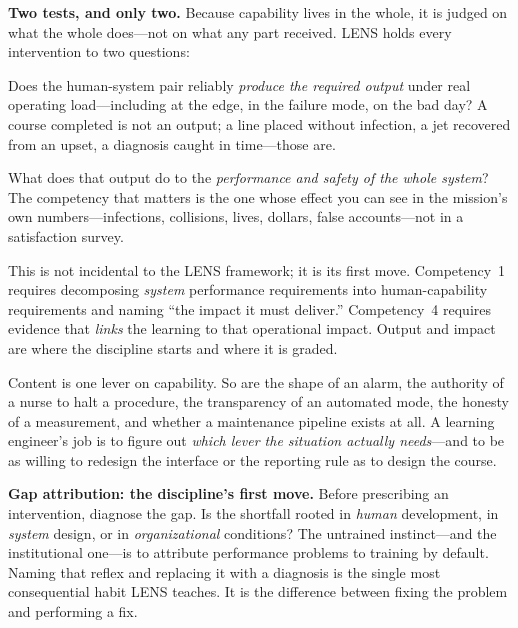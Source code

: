 \documentclass[11pt]{article}
\begin{document}
\begin{softbox}
\textbf{Two tests, and only two.} Because capability lives in the whole, it is judged on what the whole does---not on what any part received. LENS holds every intervention to two questions:

\smallskip
\begin{description}[leftmargin=0em,itemsep=3pt,topsep=2pt,font=\color{lensink}\bfseries]
  \item[Functional output.] Does the human-system pair reliably \emph{produce the required output} under real operating load---including at the edge, in the failure mode, on the bad day? A course completed is not an output; a line placed without infection, a jet recovered from an upset, a diagnosis caught in time---those are.
  \item[System impact.] What does that output do to the \emph{performance and safety of the whole system}? The competency that matters is the one whose effect you can see in the mission's own numbers---infections, collisions, lives, dollars, false accounts---not in a satisfaction survey.
\end{description}
\smallskip
This is not incidental to the LENS framework; it is its first move. Competency~1 requires decomposing \emph{system} performance requirements into human-capability requirements and naming ``the impact it must deliver.'' Competency~4 requires evidence that \emph{links} the learning to that operational impact. Output and impact are where the discipline starts and where it is graded.
\end{softbox}

Content is one lever on capability. So are the shape of an alarm, the authority of a nurse to halt a procedure, the transparency of an automated mode, the honesty of a measurement, and whether a maintenance pipeline exists at all. A learning engineer's job is to figure out \emph{which lever the situation actually needs}---and to be as willing to redesign the interface or the reporting rule as to design the course.

\begin{softbox}
\textbf{Gap attribution: the discipline's first move.} Before prescribing an intervention, diagnose the gap. Is the shortfall rooted in \emph{human} development, in \emph{system} design, or in \emph{organizational} conditions? The untrained instinct---and the institutional one---is to attribute performance problems to training by default. Naming that reflex and replacing it with a diagnosis is the single most consequential habit LENS teaches. It is the difference between fixing the problem and performing a fix.
\end{softbox}
\end{document}
